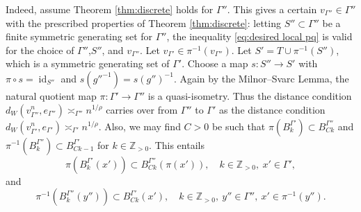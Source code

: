\documentclass[11pt,reqno]{amsart}
\newcommand{\1}{\mathbf 1}
\begin{document}
Indeed, assume Theorem \ref{thm:discrete} holds for $\Gamma''$. This gives a certain $v_{\Gamma''}\in \Gamma''$ with the prescribed properties of Theorem \ref{thm:discrete}: letting $S''\subset \Gamma''$ be a finite symmetric generating set for $\Gamma''$, the inequality \eqref{eq:desired local pq} is valid for the choice of $\Gamma''$,$S''$, and $v_{\Gamma''}$. Let $v_{\Gamma'}\in \pi^{-1}\left(v_{\Gamma''}\right)$. Let $S'=T\cup \pi^{-1}\left(S''\right)$, which is a symmetric generating set of $\Gamma'$. Choose a map $s:S''\to S'$ with $\pi\circ s=\operatorname{id}_{S''}$ and $s\left(g''^{-1}\right)=s\left(g''\right)^{-1}$. Again by the Milnor--Svarc Lemma, the natural quotient map $\pi:\Gamma'\to\Gamma''$ is a quasi-isometry. Thus the distance condition $d_W\left(v^n_{\Gamma''},e_{\Gamma''}\right)\asymp_{\Gamma''} n^{1/\rho}$ carries over from $\Gamma''$ to $\Gamma'$ as the distance condition $d_W\left(v^n_{\Gamma'},e_{\Gamma'}\right)\asymp_{\Gamma'} n^{1/\rho}$. Also, we may find $C>0$ be such that $\pi\left(B_k^{\Gamma'}\right)\subset B_{Ck}^{\Gamma''}$ and $\pi^{-1}\left(B_k^{\Gamma''}\right)\subset B^{\Gamma'}_{Ck-1}$ for $k\in \mathbb{Z}_{>0}$. This entails
\begin{equation}\label{eq:proj-inclu-1}
\pi\left(B_k^{\Gamma'}\left(x'\right)\right)\subset B_{Ck}^{\Gamma''}\left(\pi\left(x'\right)\right),\quad k\in \mathbb{Z}_{>0}, ~x'\in \Gamma',
\end{equation}
and
\begin{equation}\label{eq:proj-inclu-2}
\pi^{-1}\left(B_k^{\Gamma''}\left(y''\right)\right)\subset B^{\Gamma'}_{Ck}\left(x'\right),\quad k\in \mathbb{Z}_{>0},~y''\in \Gamma'',~x'\in \pi^{-1}\left(y''\right).
\end{equation}
\end{document}
